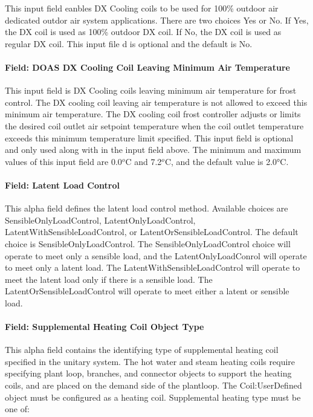 This input field eanbles DX Cooling coils to be used for 100\% outdoor air dedicated outdor air system applications. There are two choices Yes or No. If Yes, the DX coil is used as 100\% outdoor DX coil. If No, the DX coil is used as regular DX coil. This input file d is optional and the default is No.

\paragraph{Field: DOAS DX Cooling Coil Leaving Minimum Air Temperature}\label{field-doas-dx-cooling-coil-leaving-minimum-air-temperature}

This input field is DX Cooling coils leaving minimum air temperature for frost control. The DX cooling coil leaving air temperature is not allowed to exceed this minimum air temperature. The DX cooling coil frost controller adjusts or limits the desired coil outlet air setpoint temperature when the coil outlet temperature exceeds this minimum temperature limit specified. This input field is optional and only used along with in the input field above. The minimum and maximum values of this input field are 0.0\(^{o}\)C and 7.2\(^{o}\)C, and the default value is 2.0°C.

\paragraph{Field: Latent Load Control}\label{field-latent-load-control}

This alpha field defines the latent load control method. Available choices are SensibleOnlyLoadControl, LatentOnlyLoadControl, LatentWithSensibleLoadControl, or LatentOrSensibleLoadControl. The default choice is SensibleOnlyLoadControl. The SensibleOnlyLoadControl choice will operate to meet only a sensible load, and the LatentOnlyLoadConrol will operate to meet only a latent load. The LatentWithSensibleLoadControl will operate to meet the latent load only if there is a sensible load. The LatentOrSensibleLoadControl will operate to meet either a latent or sensible load.

\paragraph{Field: Supplemental Heating Coil Object Type}\label{field-supplemental-heating-coil-object-type}

This alpha field contains the identifying type of supplemental heating coil specified in the unitary system. The hot water and steam heating coils require specifying plant loop, branches, and connector objects to support the heating coils, and are placed on the demand side of the plantloop. The Coil:UserDefined object must be configured as a heating coil. Supplemental heating type must be one of:

